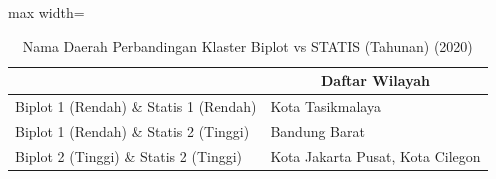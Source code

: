 \begin{table}[H]
\centering
\caption{Nama Daerah Perbandingan Klaster Biplot vs STATIS (Tahunan) (2020)} \label{tab:sample1biplot_statis_comp_name_2020}
\begin{adjustbox}{max width=\textwidth}
\begin{tabular}{|>{\centering\arraybackslash}p{4cm}|p{10cm}|}
\hline
\multicolumn{1}{|c|}{\textbf{Kategori}} & \multicolumn{1}{c|}{\textbf{Daftar Wilayah}} \\
\hline
Biplot 1 (Rendah) \& Statis 1 (Rendah) & Kota Tasikmalaya \\
\hline
Biplot 1 (Rendah) \& Statis 2 (Tinggi) & Bandung Barat \\
\hline
Biplot 2 (Tinggi) \& Statis 2 (Tinggi) & Kota Jakarta Pusat, Kota Cilegon \\
\hline
\end{tabular}
\end{adjustbox}
\end{table}
